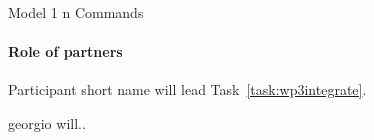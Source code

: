 \begin{workpackage}{Model 1 n Commands}
\begin{wpdescription}
    \paragraph{Role of partners}
    \begin{description*}
    \item[Participant short name] will lead Task~\ref{task:wp3integrate}.
    \item[georgio] will..
    \end{description*}
  \end{wpdescription}
  
  \begin{wpdeliverables}

    \label{dev:wp3specs}
    
    \label{dev:wp3implementation}

    \label{dev:wp3prototype}

  \end{wpdeliverables}

\end{workpackage}


